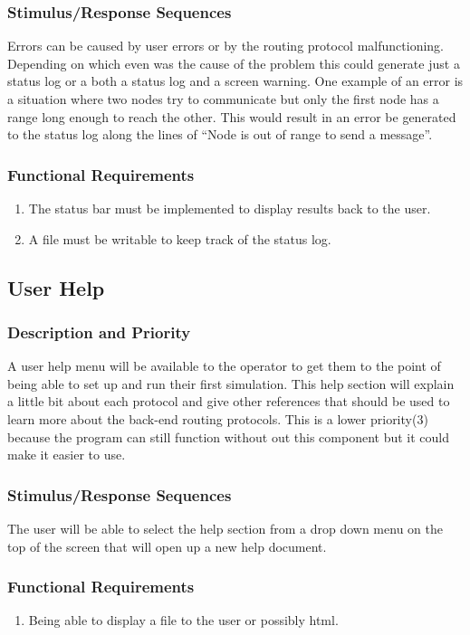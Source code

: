 \documentclass[a4paper,11pt,titlepage]{article}
\begin{document}
\subsubsection{Stimulus/Response Sequences}
Errors can be caused by user errors or by the routing protocol malfunctioning.
Depending on which even was the cause of the problem this could generate just a
status log or a both a status log and a screen warning. One example of an error is a
situation where two nodes try to communicate but only the first node has a range long
enough to reach the other. This would result in an error be generated to the status log
along the lines of “Node is out of range to send a message”.
\subsubsection{Functional Requirements}
\begin{enumerate}[{\bf {REQ} 1}]
  \item The status bar must be implemented to display results back to the user.
  \item A file must be writable to keep track of the status log.
\end{enumerate}

\subsection{User Help}
\subsubsection{Description and Priority}
A user help menu will be available to the operator to get them to the point of being able
to set up and run their first simulation. This help section will explain a little bit about
each protocol and give other references that should be used to learn more about the
back-end routing protocols. This is a lower priority(3) because the program can still
function without out this component but it could make it easier to use.
\subsubsection{Stimulus/Response Sequences}
The user will be able to select the help section from a drop down menu on the top of
the screen that will open up a new help document.

\subsubsection{Functional Requirements}
\begin{enumerate}[{\bf {REQ} 1}]
  \item Being able to display a file to the user or possibly html.
\end{enumerate}
\end{document}
